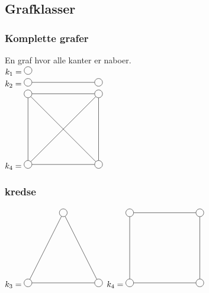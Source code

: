 \documentclass[12pt, a4paper]{article}
\begin{document}
		\subsection{Grafklasser}
			\subsubsection{Komplette grafer}
				En graf hvor alle kanter er naboer.\\
				$k_1=\begin{tikzpicture}[scale=3]
					\tikzstyle{vertex}=[circle,draw=black]
					\node[vertex](v1) at (0,0){};
				\end{tikzpicture}$\\
				$k_2=\begin{tikzpicture}[scale=3]
					\tikzstyle{vertex}=[circle,draw=black]
					\node[vertex](v1) at (0,0){};
					\node[vertex](v2) at (1,0){};
					\path[-]
						(v1) edge node {}(v2);
				\end{tikzpicture}$\\
				$k_4=\begin{tikzpicture}[scale=3]
					\tikzstyle{vertex}=[circle,draw=black]
					\node[vertex](v1) at (0,0){};
					\node[vertex](v2) at (1,0){};
					\node[vertex](v3) at (0,1){};
					\node[vertex](v4) at (1,1){};
					\path[-]
						(v1) edge node {}(v2)
						(v1) edge node {}(v3)
						(v1) edge node {}(v4)
						(v3) edge node {}(v2)
						(v3) edge node {}(v4)
						(v4) edge node {}(v2);
				\end{tikzpicture}$\\
			\subsubsection{kredse}
				$k_3=\begin{tikzpicture}[scale=3]
					\tikzstyle{vertex}=[circle,draw=black]
					\node[vertex](v1) at (0,0){};
					\node[vertex](v2) at (1,0){};
					\node[vertex](v3) at (0.5,1){};
					\path[-]
						(v1) edge node {}(v2)
						(v2) edge node {}(v3)
						(v3) edge node {}(v1);
				\end{tikzpicture}$
				$k_4=\begin{tikzpicture}[scale=3]
					\tikzstyle{vertex}=[circle,draw=black]
					\node[vertex](v1) at (0,0){};
					\node[vertex](v2) at (1,0){};
					\node[vertex](v4) at (0,1){};
					\node[vertex](v3) at (1,1){};
					\path[-]
						(v1) edge node {}(v2)
						(v2) edge node {}(v3)
						(v4) edge node {}(v1)
						(v3) edge node {}(v4);
				\end{tikzpicture}$\\
\end{document}
